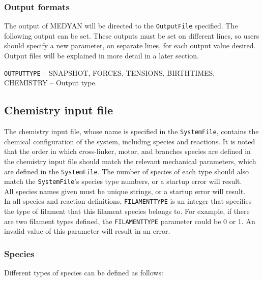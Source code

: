 \documentclass[11pt, oneside]{article}   	%
\begin{document}
\subsubsection{Output formats}

The output of MEDYAN will be directed to the \texttt{OutputFile} specified. The following output can be set. These outputs must be set on different lines, so users should specify a new parameter, on separate lines, for each output value desired. Output files will be explained in more detail in a later section.\\

\small

  \noindent\texttt{OUTPUTTYPE} -- SNAPSHOT, FORCES, TENSIONS, BIRTHTIMES, CHEMISTRY -- Output type.\\
 
\normalsize


\subsection{Chemistry input file}
The chemistry input file, whose name is specified in the \texttt{SystemFile}, contains the chemical configuration of the system, including species and reactions. It is noted that the order in which cross-linker, motor, and branches species are defined in the chemistry input file should match the relevant mechanical parameters, which are defined in the \texttt{SystemFile}. The number of species of each type should also match the \texttt{SystemFile}'s species type numbers, or a startup error will result. \\

\noindent All species names given must be unique strings, or a startup error will result.\\

\noindent In all species and reaction definitions, \texttt{FILAMENTTYPE} is an integer that specifies the type of filament that this filament species belongs to. For example, if there are two filament types defined, the \texttt{FILAMENTTYPE} parameter could be 0 or 1. An invalid value of this parameter will result in an error.

\subsubsection{Species}
Different types of species can be defined as follows:
\end{document}
